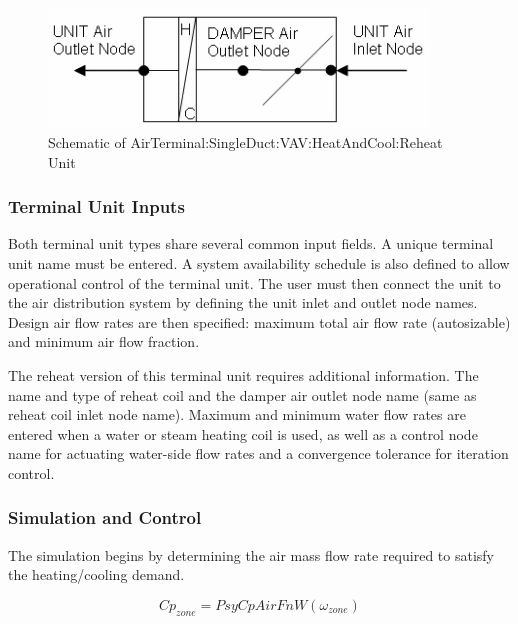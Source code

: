 \begin{figure}[hbtp] %
\centering
\includegraphics[width=0.9\textwidth, height=0.9\textheight, keepaspectratio=true]{media/image2792.png}
\caption{Schematic of AirTerminal:SingleDuct:VAV:HeatAndCool:Reheat Unit \protect \label{fig:schematic-of-airterminal-singleduct-vav-003}}
\end{figure}

\subsubsection{Terminal Unit Inputs}\label{terminal-unit-inputs}

Both terminal unit types share several common input fields. A unique terminal unit name must be entered. A system availability schedule is also defined to allow operational control of the terminal unit. The user must then connect the unit to the air distribution system by defining the unit inlet and outlet node names. Design air flow rates are then specified: maximum total air flow rate (autosizable) and minimum air flow fraction.

The reheat version of this terminal unit requires additional information. The name and type of reheat coil and the damper air outlet node name (same as reheat coil inlet node name). Maximum and minimum water flow rates are entered when a water or steam heating coil is used, as well as a control node name for actuating water-side flow rates and a convergence tolerance for iteration control.

\subsubsection{Simulation and Control}\label{simulation-and-control}

The simulation begins by determining the air mass flow rate required to satisfy the heating/cooling demand.

\begin{equation}
C{p_{zone}} = PsyCpAirFnW\left( {{\omega_{zone}}} \right)
\end{equation}

